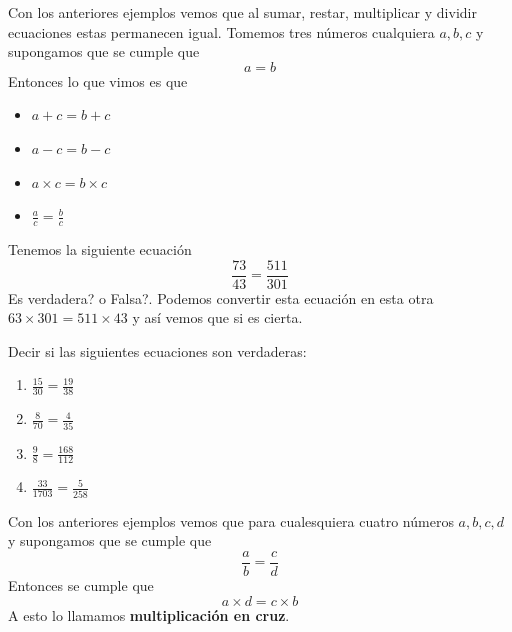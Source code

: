 \begin{tcolorbox}[colback=red!5!white,colframe=red!75!black]
	Con los anteriores ejemplos vemos que al sumar, restar, multiplicar y dividir ecuaciones estas permanecen igual. Tomemos tres números cualquiera $a,b,c$ y supongamos que se cumple que
	\[
	a=b
	\]
	Entonces lo que vimos es que 
	\begin{multicols}{4}
		\begin{itemize}
			\item $a+c = b+c$
			\item $a-c = b-c$
			\item $a\times c = b\times c$
			\item $\frac{a}{c} = \frac{b}{c}$
		\end{itemize}
	\end{multicols}
\end{tcolorbox}

\begin{ejemplo} 
	Tenemos la siguiente ecuación 
	\[
	\frac{73}{43}=\frac{511}{301}
	\]
	Es verdadera? o Falsa?.  Podemos convertir esta ecuación en esta otra $63\times 301 = 511 \times 43$ y así vemos que si es cierta.
\end{ejemplo}

\begin{exer}
Decir si las siguientes ecuaciones son verdaderas:
	\begin{multicols}{4}
		\begin{enumerate}[label= \Alph*)]
			\item $\frac{15}{30}=\frac{19}{38}$
			\item $\frac{8}{70}=\frac{4}{35}$
			\item $\frac{9}{8}=\frac{168}{112}$
			\item $\frac{33}{1703}=\frac{5}{258}$
		\end{enumerate}
	\end{multicols}
\end{exer}

\begin{tcolorbox}[colback=red!5!white,colframe=red!75!black]
	Con los anteriores ejemplos vemos que para cualesquiera cuatro números $a,b,c,d$ y supongamos que se cumple que
	\[
	\frac{a}{b} = \frac{c}{d}
	\]
	Entonces se cumple que 
	\[
	a\times d = c\times b
	\]
	A esto lo llamamos \textbf{multiplicación en cruz}.
\end{tcolorbox}



